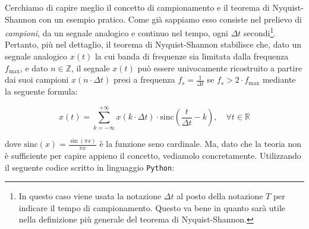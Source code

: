 \documentclass[a4paper,12pt]{report}  %
\newcommand{\lstinlinebg}[1]{\colorbox{backcolour}{\lstinline|#1|}}
\begin{document}
Cerchiamo di capire meglio il concetto di campionamento e il teorema di Nyquist-Shannon con un esempio pratico.
Come già sappiamo esso consiste nel prelievo di \textit{campioni}, da un segnale analogico e continuo nel tempo, ogni $\Delta t$ secondi\footnote{In questo caso viene usata la notazione $\Delta t$ al posto della notazione $T$ per indicare il tempo di campionamento. Questo va bene in quanto sarà utile nella definizione più generale del teorema di Nyquist-Shannon.}.
Pertanto, più nel dettaglio, il teorema di Nyquist-Shannon stabilisce che, dato un segnale analogico $x(t)$ la cui banda di frequenze sia limitata dalla frequenza $f_{\text{max}}$, e dato $n \in \mathbb{Z}$, il segnale $x(t)$ può essere univocamente ricostruito a partire dai suoi campioni $x(n \cdot \Delta t)$ presi a frequenza $f_s = \frac{1}{\Delta t}$ se $f_s > 2 \cdot f_{\text{max}}$ mediante la seguente formula:

\begin{equation}
    x(t) = \sum_{k = -\infty}^{+\infty} x(k \cdot \Delta t) \cdot \text{sinc}\left( \frac{t}{\Delta t} - k \right), \quad \forall t \in \mathbb{R} \nonumber
\end{equation}

dove $\text{sinc}(x) = \frac{\sin(\pi x)}{\pi x}$ è la funzione seno cardinale.
Ma, dato che la teoria non è sufficiente per capire appieno il concetto, vediamolo concretamente.
Utilizzando il seguente codice scritto in linguaggio \lstinlinebg{Python}:
\end{document}
